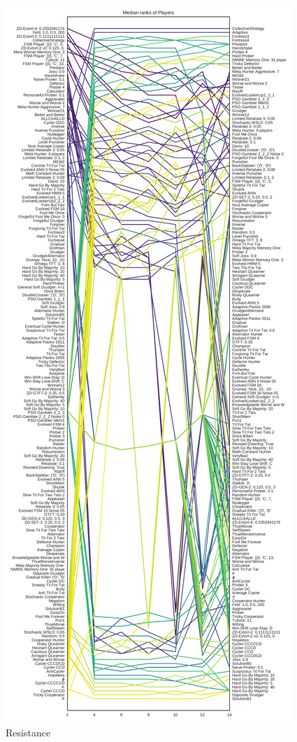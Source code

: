 \documentclass{article}
\begin{document}
\begin{figure}[!hbtp]
    \centering
    \includegraphics[height=.9\textheight]{../img/median_rank_vs_population_size_resistance.pdf}
    \caption{Resistance}
    \label{fig:ranks_v_size_resistance}
\end{figure}
\end{document}
